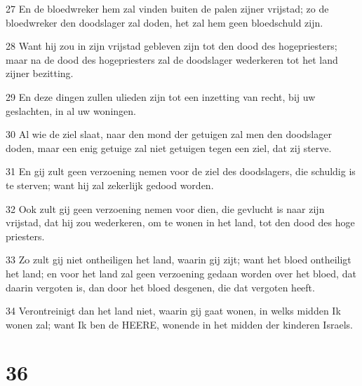 \par 27 En de bloedwreker hem zal vinden buiten de palen zijner vrijstad; zo de bloedwreker den doodslager zal doden, het zal hem geen bloedschuld zijn.
\par 28 Want hij zou in zijn vrijstad gebleven zijn tot den dood des hogepriesters; maar na de dood des hogepriesters zal de doodslager wederkeren tot het land zijner bezitting.
\par 29 En deze dingen zullen ulieden zijn tot een inzetting van recht, bij uw geslachten, in al uw woningen.
\par 30 Al wie de ziel slaat, naar den mond der getuigen zal men den doodslager doden, maar een enig getuige zal niet getuigen tegen een ziel, dat zij sterve.
\par 31 En gij zult geen verzoening nemen voor de ziel des doodslagers, die schuldig is te sterven; want hij zal zekerlijk gedood worden.
\par 32 Ook zult gij geen verzoening nemen voor dien, die gevlucht is naar zijn vrijstad, dat hij zou wederkeren, om te wonen in het land, tot den dood des hoge priesters.
\par 33 Zo zult gij niet ontheiligen het land, waarin gij zijt; want het bloed ontheiligt het land; en voor het land zal geen verzoening gedaan worden over het bloed, dat daarin vergoten is, dan door het bloed desgenen, die dat vergoten heeft.
\par 34 Verontreinigt dan het land niet, waarin gij gaat wonen, in welks midden Ik wonen zal; want Ik ben de HEERE, wonende in het midden der kinderen Israels.

\chapter{36}


